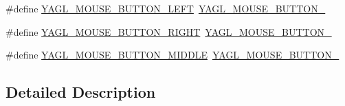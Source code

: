 \begin{DoxyCompactItemize}
\item 
\#define \hyperlink{group____consts__key__mouse_gae7fda446cf8e1280341ed09db29a7f77}{Y\-A\-G\-L\-\_\-\-M\-O\-U\-S\-E\-\_\-\-B\-U\-T\-T\-O\-N\-\_\-\-L\-E\-F\-T}~\hyperlink{group____consts__key__mouse_ga08367b01f0dc87f21660857cc11a66e7}{Y\-A\-G\-L\-\_\-\-M\-O\-U\-S\-E\-\_\-\-B\-U\-T\-T\-O\-N\-\_}
\item 
\#define \hyperlink{group____consts__key__mouse_ga4d1db125f4a5686add18d8291baefee9}{Y\-A\-G\-L\-\_\-\-M\-O\-U\-S\-E\-\_\-\-B\-U\-T\-T\-O\-N\-\_\-\-R\-I\-G\-H\-T}~\hyperlink{group____consts__key__mouse_gade4edcc8b61aac75dc1d3056c0272635}{Y\-A\-G\-L\-\_\-\-M\-O\-U\-S\-E\-\_\-\-B\-U\-T\-T\-O\-N\-\_}
\item 
\#define \hyperlink{group____consts__key__mouse_ga09372ea501d3b220f189fb3b0eabeea6}{Y\-A\-G\-L\-\_\-\-M\-O\-U\-S\-E\-\_\-\-B\-U\-T\-T\-O\-N\-\_\-\-M\-I\-D\-D\-L\-E}~\hyperlink{group____consts__key__mouse_gaa8a1dc5364ad7724455d8b8b26168d9e}{Y\-A\-G\-L\-\_\-\-M\-O\-U\-S\-E\-\_\-\-B\-U\-T\-T\-O\-N\-\_}
\end{DoxyCompactItemize}


\subsection{Detailed Description}


